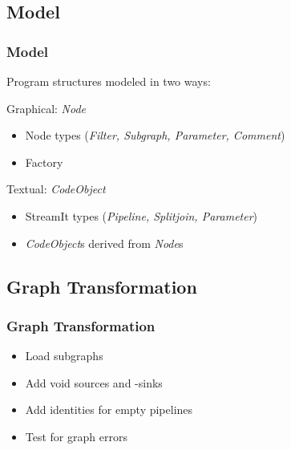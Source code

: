 \documentclass{beamer}
\begin{document}
\subsection{Model}
\begin{frame}
\frametitle{Model}
Program structures modeled in two ways:
\begin{block}{Graphical: \textit{Node}}
	\begin{itemize}
		\item Node types (\textit{Filter, Subgraph, Parameter, Comment})
		\item Factory
	\end{itemize}
\end{block}
\begin{block}{Textual: \textit{CodeObject}}
	\begin{itemize}
		\item StreamIt types (\textit{Pipeline, Splitjoin, Parameter})
		\item \textit{CodeObject}s derived from \textit{Node}s
	\end{itemize}
\end{block}
\end{frame}

\subsection{Graph Transformation}
\begin{frame}
\frametitle{Graph Transformation}
	\begin{itemize}
		\item Load subgraphs
		\item Add void sources and -sinks
		\item Add identities for empty pipelines
		\item Test for graph errors %
	\end{itemize}
\end{frame}

\end{document}

